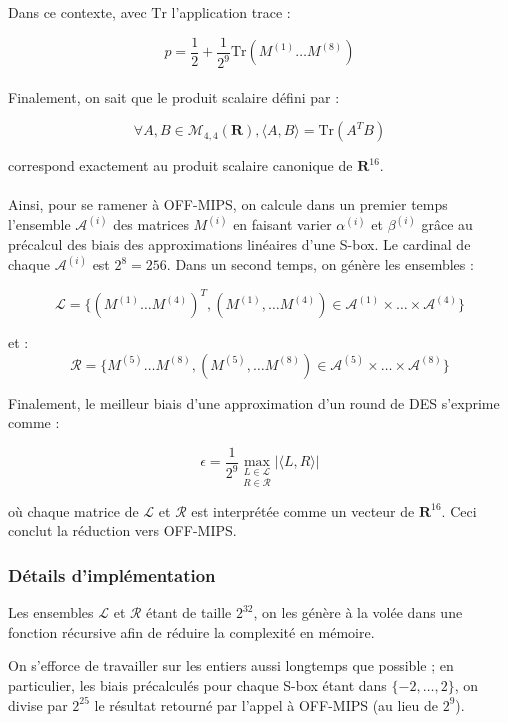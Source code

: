 \documentclass{scrartcl}
\begin{document}
Dans ce contexte, avec $\text{Tr}$ l'application trace : 

$$p=\frac{1}{2}+\frac{1}{2^9} \text{Tr}(M^{(1)}\ldots M^{(8)})$$

\paragraph*{}
Finalement, on sait que le produit scalaire défini par :

$$\forall A,B\in \mathcal{M}_{4,4}(\mathbf{R}), \langle A,B\rangle=\text{Tr}(A^T B)$$

correspond exactement au produit scalaire canonique de $\mathbf{R}^{16}$.

\paragraph*{}
Ainsi, pour se ramener à OFF-MIPS, on calcule dans un premier temps l'ensemble $\mathcal{A}^{(i)}$ des matrices $M^{(i)}$
en faisant varier $\alpha^{(i)}$ et $\beta^{(i)}$ grâce au précalcul des biais des approximations linéaires d'une S-box.
Le cardinal de chaque $\mathcal{A}^{(i)}$ est $2^8=256$. Dans un second temps,
on génère les ensembles :

$$\mathcal{L}=\{(M^{(1)}\ldots M^{(4)})^T, (M^{(1)}, \ldots M^{(4)})\in \mathcal{A}^{(1)}\times \ldots \times \mathcal{A}^{(4)}\}$$

et :
$$\mathcal{R}=\{M^{(5)}\ldots M^{(8)}, (M^{(5)}, \ldots M^{(8)})\in \mathcal{A}^{(5)}\times \ldots \times \mathcal{A}^{(8)}\}$$

Finalement, le meilleur biais d'une approximation d'un round de DES s'exprime comme :

$$\epsilon=\frac{1}{2^9}\underset{R\in\mathcal{R}}{\underset{L\in\mathcal{L}}{\max}}|\langle L,R\rangle|$$

où chaque matrice de $\mathcal{L}$ et $\mathcal{R}$ est interprétée comme un vecteur de $\mathbf{R}^{16}$. Ceci conclut la réduction vers
OFF-MIPS.

\subsubsection{Détails d'implémentation}

Les ensembles $\mathcal{L}$ et $\mathcal{R}$ étant de taille $2^{32}$, on les génère à la volée dans une fonction récursive
afin de réduire la complexité en mémoire.

On s'efforce de travailler sur les entiers aussi longtemps que possible ; en particulier, les biais précalculés pour
chaque S-box étant dans $\{-2, \ldots, 2\}$, on divise par $2^{25}$ le résultat retourné par l'appel à OFF-MIPS (au lieu de $2^9$).
\end{document}
